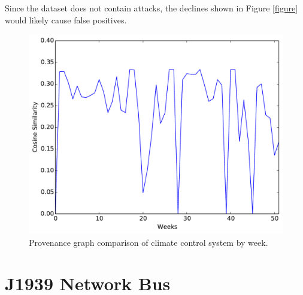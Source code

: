 Since the dataset does not contain attacks, the declines shown in Figure \ref{figure} would likely cause false positives.
 




\begin{figure}[tb]
\begin{center}
\includegraphics[width=.6\columnwidth]{foo.pdf}
\end{center}
\caption{Provenance graph comparison of climate control system by week.}
\label{figure_climate}
\end{figure}

\section{J1939 Network Bus }

